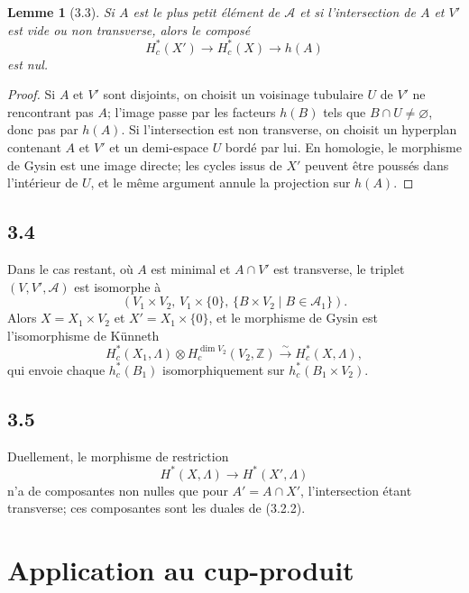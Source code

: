 \documentclass[11pt]{article}
\newtheorem{lemma}[theorem]{Lemme}
\theoremstyle{definition}
\newcommand{\ZZ}{\mathbb Z}
\begin{document}
\begin{lemma}[3.3]
Si $A$ est le plus petit élément de $\mathcal A$ et si l'intersection de $A$ et $V'$ est vide ou non transverse, alors le composé
\[
H_c^*(X')\longrightarrow H_c^*(X)\longrightarrow h(A)
\]
est nul.
\end{lemma}
\begin{proof}
Si $A$ et $V'$ sont disjoints, on choisit un voisinage tubulaire $U$ de $V'$ ne rencontrant pas $A$; l'image passe par les facteurs $h(B)$ tels que $B\cap U\neq\varnothing$, donc pas par $h(A)$. Si l'intersection est non transverse, on choisit un hyperplan contenant $A$ et $V'$ et un demi-espace $U$ bordé par lui. En homologie, le morphisme de Gysin est une image directe; les cycles issus de $X'$ peuvent être poussés dans l'intérieur de $U$, et le même argument annule la projection sur $h(A)$.
\end{proof}

\subsection*{3.4}
Dans le cas restant, où $A$ est minimal et $A\cap V'$ est transverse, le triplet $(V,V',\mathcal A)$ est isomorphe à
\[
(V_1\times V_2,\,V_1\times\{0\},\,\{B\times V_2\mid B\in\mathcal A_1\}).
\]
Alors $X=X_1\times V_2$ et $X'=X_1\times\{0\}$, et le morphisme de Gysin est l'isomorphisme de Künneth
\[
H_c^*(X_1,\Lambda)\otimes H_c^{\dim V_2}(V_2,\ZZ)\xrightarrow{\sim}H_c^*(X,\Lambda),
\]
qui envoie chaque $h_c^*(B_1)$ isomorphiquement sur $h_c^*(B_1\times V_2)$.

\subsection*{3.5}
Duellement, le morphisme de restriction
\begin{equation}
H^*(X,\Lambda)\longrightarrow H^*(X',\Lambda)\tag{3.5.1}
\end{equation}
n'a de composantes non nulles que pour $A'=A\cap X'$, l'intersection étant transverse; ces composantes sont les duales de (3.2.2).

\section{Application au cup-produit}
\end{document}
